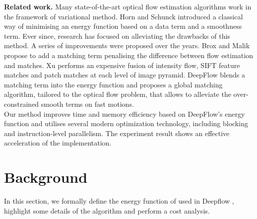 \documentclass[letterpaper]{article}
\newcommand{\mypar}[1]{{\bf #1.}}
\begin{document}
\mypar{Related work} 
Many state-of-the-art optical flow estimation algorithms work in the framework of variational method. Horn and Schunck \cite{Baker:2004:LYU:964568.964604} introduced a classical way of minimising an energy function based on a data term and a smoothness term. Ever since, research has focused on alleviating the drawbacks of this method. A series of improvements were proposed over the years. Brox and Malik \cite{Brox:2011:LDO:1936329.1936562} propose to add a matching term penalising the difference between flow estimation and matches. Xu\cite{5539820} performs an expensive fusion of intensity flow, SIFT feature matches \cite{Szeliski}  and patch matches \cite{Barnes:2010:GPC:1927006.1927010} at each level of image pyramid. DeepFlow \cite{Weinzaepfel:2013:DLD:2586117.2586991} blends a matching term into the energy function and proposes a global matching algorithm, tailored to the optical flow problem, that allows to alleviate the over-constrained smooth terms on fast motions.\\
Our method improves time and memory efficiency based on DeepFlow's energy function and utilises several modern optimization technology, including blocking and instruction-level parallelism. The experiment result shows an effective  acceleration of the implementation.

\section{Background}\label{sec:background}

In this section, we formally define the energy function of used in Deepflow \cite{Weinzaepfel:2013:DLD:2586117.2586991}, highlight some details of the algorithm and perform a cost analysis.
\end{document}
